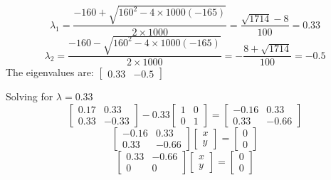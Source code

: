 \documentclass[12pt,a4paper]{paper}
\begin{document}
\begin{enumerate}
\begin{enumerate}
\begin{equation}
\lambda_{1} = \frac{-160+\sqrt{160^2-4 \times 1000\left(-165\right)}}{2 \times 1000} = \frac{\sqrt{1714}-8}{100} = 0.33
\end{equation}
\begin{equation}
\lambda_{2} = \frac{-160-\sqrt{160^2-4 \times 1000\left(-165\right)}}{2 \times 1000} = -\frac{8 + \sqrt{1714}}{100} = -0.5
\end{equation}
The eigenvalues are: $\left[\begin{array}{cc} 0.33 & -0.5 \end{array}\right]$

Solving for $\lambda = 0.33$
\begin{equation}
\left[\begin{array}{cc}0.17 & 0.33 \\ 0.33 & -0.33\end{array}\right] - 0.33 \left[\begin{array}{cc}1 & 0 \\0 & 1\end{array}\right] = \left[\begin{array}{cc}-0.16 & 0.33 \\ 0.33 & -0.66\end{array}\right]
\end{equation}
\begin{equation}
\left[\begin{array}{cc}-0.16 & 0.33 \\ 0.33 & -0.66\end{array}\right]\left[\begin{array}{c}x\\y\end{array}\right] = \left[\begin{array}{c}0\\0\end{array}\right]
\end{equation}
\begin{equation}
\left[\begin{array}{cc}0.33 & -0.66 \\ 0 & 0\end{array}\right]\left[\begin{array}{c}x\\y\end{array}\right] = \left[\begin{array}{c}0\\0\end{array}\right]
\end{equation}

\end{enumerate}
\end{enumerate}
\end{document}
